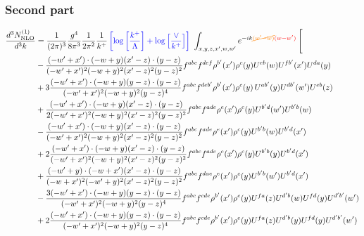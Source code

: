 \documentclass[aps,prd,amsmath,amssymb,nofootinbib]{revtex4-2}
\numberwithin{equation}{section}
\begin{document}
\subsubsection{Second part}
\begin{align}
     \frac{d^{3}N^{(1)}_{\rm NLO}}{d^{3}k} & = \frac{1}{(2\pi)^{3}}\frac{g^{4}}{8\pi^{3}}\frac{1}{2\pi^{2}} \frac{1}{k^{+}}\,{\color{blue}\left[\log{\left[\frac{k^{+}}{\Lambda}\right]}+\log{\left[\frac{\vee}{k^{+}}\right]}\right]}\,\,\int_{x,y,z,x^{\prime},w,w^{\prime}}e^{-ik{\color{orange}\cancel{(w^{\prime}-w)}}{\color{red}(w-w^{\prime})}}\, \Bigg[\notag \\ & - \frac{( - w' + x') \cdot ( - w + y) (x' - z) \cdot (y - z)}{( - w' + x')^{2} ( - w + y)^{2} (x' - z)^{2} (y - z)^{2}} f^{a b c} f^{d e f} \rho^{b'}(x') \rho^{c}(y) U^{e b}(w) U^{fb'}(x') U^{d a}(y) \nonumber\\
      &+ 3 \frac{( - w' + x') \cdot ( - w + y) (y - z) \cdot (y - z)}{( - w' + x')^{2} ( - w + y)^{2} (y - z)^{4}} f^{a b c} f^{d e b'} \rho^{b'}(x') \rho^{c}(y) \, U^{a b'}(y) U^{d b'}(w') U^{e b}(z)\nonumber\\
    &+\frac{( - w' + x') \cdot ( - w + y) (x' - z) \cdot (y - z)}{2 ( - w' + x')^{2} ( - w + y)^{2} (x' - z)^{2} (y - z)^{2}} f^{a b c} f^{a d e} \rho^{e}(x') \rho^{c}(y) U^{b'd}(w') U^{b' b}(w)\nonumber\\
    &- \frac{( - w' + x') \cdot ( - w + y) (x' - z) \cdot (y - z)}{( - w' + x')^{2} ( - w + y)^{2} (x' - z)^{2} (y - z)^{2}} f^{a b c} f^{a d e} \rho^{e}(x') \rho^{c}(y) U^{b' b}(w) U^{b' d}(x')\nonumber\\
    &+ 2 \frac{( - w' + x') \cdot ( - w + y) (x' - z) \cdot (y - z)}{( - w' + x')^{2} ( - w + y)^{2} (x' - z)^{2} (y - z)^{2}} f^{a b c} f^{a d e} \rho^{e}(x') \rho^{c}(y) U^{b' b}(y) U^{b' d}(x')\nonumber\\
    &+ \frac{( - w' + y) \cdot ( - w + x') (x' - z) \cdot (y - z)}{( - w + x')^{2} ( - w' + y)^{2} (x' - z)^{2} (y - z)^{2}} f^{a b c} f^{d a e} \rho^{e}(x') \rho^{c}(y) U^{b' b}(w') U^{b' d}(x')\nonumber\\
    &-\frac{3 ( - w' + x') \cdot ( - w + y) (y - z) \cdot (y - z)}{( - w' + x')^{2} ( - w + y)^{2} (y - z)^{4}} f^{a b c} f^{c d e} \rho^{b'}(x') \rho^{e}(y) U^{fa}(z) U^{d'b}(w) U^{fd}(y) U^{d'b'}(w')\nonumber\\
    &+ 2 \frac{( - w' + x') \cdot ( - w + y) (y - z) \cdot (y - z)}{( - w' + x')^{2} ( - w + y)^{2} (y - z)^{4}} f^{a b c} f^{c d e} \rho^{b'}(x') \rho^{e}(y) U^{fa}(z) U^{d'b}(y) U^{fd}(y) U^{d'b'}(w')\nonumber\\

\end{align}
\end{document}
